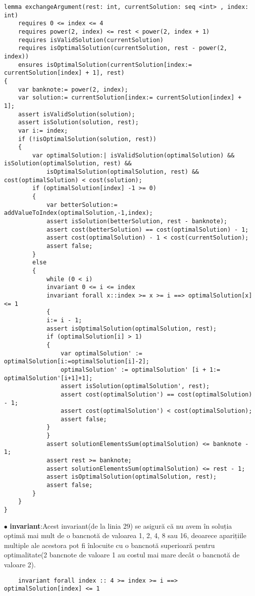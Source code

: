    \begin{lstlisting}
lemma exchangeArgument(rest: int, currentSolution: seq <int> , index: int)
    requires 0 <= index <= 4
    requires power(2, index) <= rest < power(2, index + 1)
    requires isValidSolution(currentSolution)
    requires isOptimalSolution(currentSolution, rest - power(2, index))
    ensures isOptimalSolution(currentSolution[index:= currentSolution[index] + 1], rest) 
{
    var banknote:= power(2, index);
    var solution:= currentSolution[index:= currentSolution[index] + 1];
    assert isValidSolution(solution);
    assert isSolution(solution, rest);
    var i:= index;
    if (!isOptimalSolution(solution, rest)) 
    {
        var optimalSolution:| isValidSolution(optimalSolution) && isSolution(optimalSolution, rest) &&
            isOptimalSolution(optimalSolution, rest) && cost(optimalSolution) < cost(solution);
        if (optimalSolution[index] -1 >= 0) 
        {
            var betterSolution:= addValueToIndex(optimalSolution,-1,index);
            assert isSolution(betterSolution, rest - banknote);
            assert cost(betterSolution) == cost(optimalSolution) - 1;
            assert cost(optimalSolution) - 1 < cost(currentSolution);
            assert false;
        } 
        else 
        {
            while (0 < i)
            invariant 0 <= i <= index
            invariant forall x::index >= x >= i ==> optimalSolution[x] <= 1 
            {
            i:= i - 1;
            assert isOptimalSolution(optimalSolution, rest);
            if (optimalSolution[i] > 1) 
            {
                var optimalSolution' := optimalSolution[i:=optimalSolution[i]-2];
                optimalSolution' := optimalSolution' [i + 1:= optimalSolution'[i+1]+1];
                assert isSolution(optimalSolution', rest);
                assert cost(optimalSolution') == cost(optimalSolution) - 1;
                assert cost(optimalSolution') < cost(optimalSolution);
                assert false;
            }
            }
            assert solutionElementsSum(optimalSolution) <= banknote - 1;
            assert rest >= banknote; 
            assert solutionElementsSum(optimalSolution) <= rest - 1; 
            assert isOptimalSolution(optimalSolution, rest); 
            assert false;
        }
    }
}
    \end{lstlisting}
        
$\bullet$ \textbf{invariant}:Acest invariant(de la linia 29) se asigură că 
nu avem în soluția optimă mai mult de o bancnotă de valoarea 1, 2, 4, 8 sau 16, deoarece aparițiile multiple ale acestora pot fi
înlocuite cu o bancnotă superioară pentru optimalitate(2 bancnote de valoare 1 au costul mai mare decât o bancnotă de valoare 2).\par
\begin{lstlisting}
    invariant forall index :: 4 >= index >= i ==> optimalSolution[index] <= 1
\end{lstlisting}

